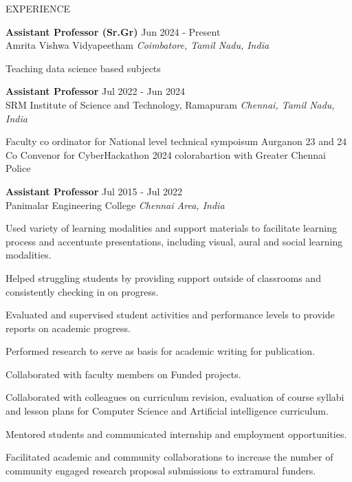 \documentclass{resume}
\begin{document}
\vspace{1.5em}


\begin{rSection}{EXPERIENCE}

\textbf{Assistant Professor (Sr.Gr)} \hfill Jun 2024 - Present\\
Amrita Vishwa Vidyapeetham \hfill \textit{Coimbatore, Tamil Nadu, India}

Teaching data science based subjects

\textbf{Assistant Professor} \hfill Jul 2022 - Jun 2024\\
SRM Institute of Science and Technology, Ramapuram \hfill \textit{Chennai, Tamil Nadu, India}

Faculty co ordinator for National level technical sympoisum Aurganon 23 and 24
Co Convenor for CyberHackathon 2024 colorabartion with Greater Chennai Police

\textbf{Assistant Professor} \hfill Jul 2015 - Jul 2022\\
Panimalar Engineering College \hfill \textit{Chennai Area, India}

Used variety of learning modalities and support materials to facilitate learning process and
accentuate presentations, including visual, aural and social learning modalities.

Helped struggling students by providing support outside of classrooms and consistently checking in
on progress.

Evaluated and supervised student activities and performance levels to provide reports on
academic progress.

Performed research to serve as basis for academic writing for publication.

Collaborated with faculty members on Funded projects.

Collaborated with colleagues on curriculum revision, evaluation of course syllabi and lesson
plans for Computer Science and Artificial intelligence curriculum. 

Mentored students and communicated internship and employment opportunities.

Facilitated academic and community collaborations to increase the number of community engaged research proposal submissions to extramural funders.


\end{rSection}
\end{document}
